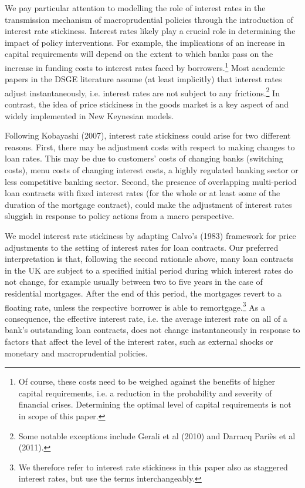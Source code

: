 \documentclass[12pt]{article}
\numberwithin{equation}{section}
\begin{document}
We pay particular attention to modelling the role of interest rates in the transmission mechanism of macroprudential policies through the introduction of interest rate stickiness. Interest rates likely play a crucial role in determining the impact of policy interventions. For example, the implications of an increase in capital requirements will depend on the extent to which banks pass on the increase in funding costs to interest rates faced by borrowers.\footnote{Of course, these costs need to be weighed against the benefits of higher capital requirements, i.e. a reduction in the probability and severity of financial crises. Determining the optimal level of capital requirements is not in scope of this paper.}  Most academic papers in the DSGE literature assume (at least implicitly) that interest rates adjust instantaneously, i.e. interest rates are not subject to any frictions.\footnote{Some notable exceptions include Gerali et al (2010) and Darracq Pariès et al (2011).}  In contrast, the idea of price stickiness in the goods market is a key aspect of and widely implemented in New Keynesian models. 

Following Kobayashi (2007), interest rate stickiness could arise for two different reasons. First, there may be adjustment costs with respect to making changes to loan rates. This may be due to customers’ costs of changing banks (switching costs), menu costs of changing interest costs, a highly regulated banking sector or less competitive banking sector. Second, the presence of overlapping multi-period loan contracts with fixed interest rates (for the whole or at least some of the duration of the mortgage contract), could make the adjustment of interest rates sluggish in response to policy actions from a macro perspective.

We model interest rate stickiness by adapting Calvo’s (1983) framework for price adjustments to the setting of interest rates for loan contracts. Our preferred interpretation is that, following the second rationale above, many loan contracts in the UK are subject to a specified initial period during which interest rates do not change, for example usually between two to five years in the case of residential mortgages. After the end of this period, the mortgages revert to a floating rate, unless the respective borrower is able to remortgage.\footnote{We therefore refer to interest rate stickiness in this paper also as staggered interest rates, but use the terms interchangeably.}  As a consequence, the effective interest rate, i.e. the average interest rate on all of a bank’s outstanding loan contracts, does not change instantaneously in response to factors that affect the level of the interest rates, such as external shocks or monetary and macroprudential policies. 
\end{document}
